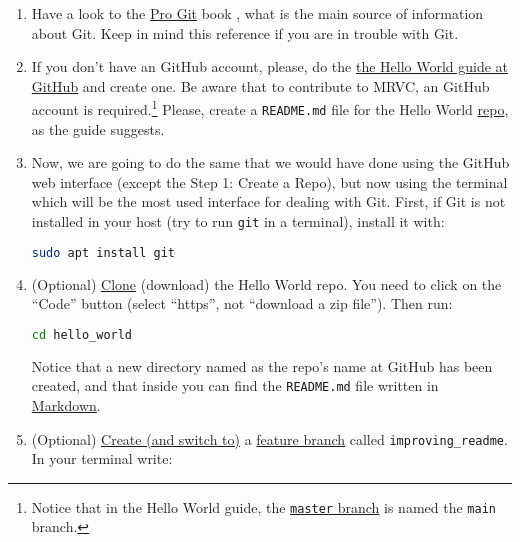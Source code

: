 \begin{enumerate}
  
\item Have a look to the \href{https://git-scm.com/book/en/v2}{Pro Git} 
  book \cite{Git-book}, what is the main source of information about
  Git. Keep in mind this reference if you are in trouble with Git.

\item If you don't have an GitHub account, please, do the
  \href{https://guides.github.com/activities/hello-world/}{the Hello
    World guide at GitHub} and create one. Be aware that to contribute
    to MRVC, an GitHub account is required.\footnote{Notice that
    in the Hello World guide,
    the \href{https://git-scm.com/book/en/v2/Git-Branching-Branches-in-a-Nutshell}{\texttt{master}
    branch} is named the \texttt{main} branch.} Please, create
    a \texttt{README.md} file for the Hello
    World \href{https://en.wikipedia.org/wiki/Software_repository}{repo},
    as the guide suggests.

\item Now, we are going to do the same that we would have done using
  the GitHub web interface (except the Step 1: Create a Repo), but now
  using the terminal which will be the most used interface for dealing
  with Git. First, if Git is not installed in your host (try to run
  \texttt{git} in a terminal), install it with:

  \begin{lstlisting}[language=bash]
    sudo apt install git
  \end{lstlisting}

\item (Optional) 
  \href{https://docs.github.com/en/github/getting-started-with-github/github-glossary#clone}{Clone}
  (download) the Hello World repo. You need to click on the ``Code''
  button (select ``https'', not ``download a
  zip file''). Then run:

  \begin{lstlisting}[language=bash]
    cd hello_world
  \end{lstlisting}

  Notice that a new directory named as the repo's name at GitHub has
  been created, and that inside you can find the \texttt{README.md}
  file written in
  \href{https://daringfireball.net/projects/markdown/}{Markdown}.

\item (Optional)
  \href{https://docs.github.com/en/github/getting-started-with-github/github-glossary#checkout}{Create
    (and switch to)} a
  \href{https://docs.github.com/en/github/getting-started-with-github/github-glossary#feature-branch}{feature
    branch} called \texttt{improving\_readme}. In your terminal write:
  

\end{enumerate}
